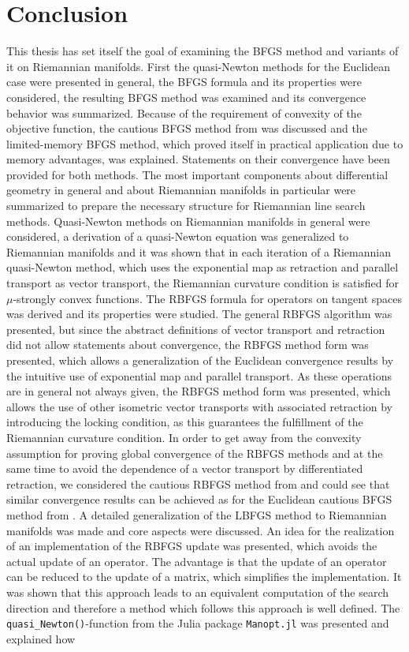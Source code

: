 \chapter{Conclusion}
\label{Chapter6}

This thesis has set itself the goal of examining the BFGS method and variants of it on Riemannian manifolds. First the quasi-Newton methods for the Euclidean case were presented  in general, the BFGS formula and its properties were considered, the resulting BFGS method was examined and its convergence behavior was summarized. Because of the requirement of convexity of the objective function, the cautious BFGS method from \cite{LiFukushima:2001} was discussed and the limited-memory BFGS method, which proved itself in practical application due to memory advantages, was explained. Statements on their convergence have been provided for both methods. The most important components about differential geometry in general and about Riemannian manifolds in particular were summarized to prepare the necessary structure for Riemannian line search methods. Quasi-Newton methods on Riemannian manifolds in general were considered, a derivation of a quasi-Newton equation was generalized to Riemannian manifolds and it was shown that in each iteration of a Riemannian quasi-Newton method, which uses the exponential map as retraction and parallel transport as vector transport, the Riemannian curvature condition is satisfied for $\mu$-strongly convex functions. The RBFGS formula for operators on tangent spaces was derived and its properties were studied. The general RBFGS algorithm was presented, but since the abstract definitions of vector transport and retraction did not allow statements about convergence, the RBFGS method form \cite{Qi:2011} was presented, which allows a generalization of the Euclidean convergence results by the intuitive use of exponential map and parallel transport. As these operations are in general not always given, the RBFGS method form \cite{HuangGallivanAbsil:2015} was presented, which allows the use of other isometric vector transports with associated retraction by introducing the locking condition, as this guarantees the fulfillment of the Riemannian curvature condition. In order to get away from the convexity assumption for proving global convergence of the RBFGS methods and at the same time to avoid the dependence of a vector transport by differentiated retraction, we considered the cautious RBFGS method from \cite{HuangAbsilGallivan:2018} and could see that similar convergence results can be achieved as for the Euclidean cautious BFGS method from \cite{LiFukushima:2001}. A detailed generalization of the LBFGS method to Riemannian manifolds was made and core aspects were discussed. An idea for the realization of an implementation of the RBFGS update was presented, which avoids the actual update of an operator. The advantage is that the update of an operator can be reduced to the update of a matrix, which simplifies the implementation. It was shown that this approach leads to an equivalent computation of the search direction and therefore a method which follows this approach is well defined. The \lstinline!quasi_Newton()!-function from the Julia package \lstinline!Manopt.jl! was presented and explained how 